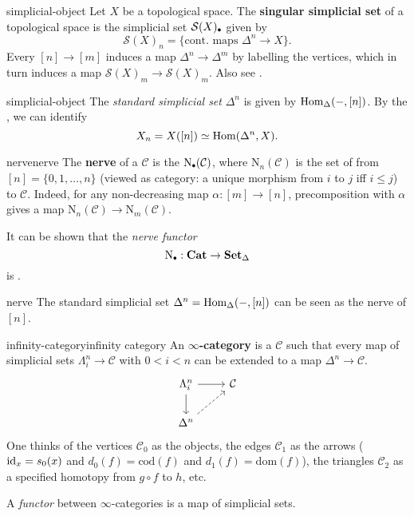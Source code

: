 \begin{example}{simplicial-object}
    Let $X$ be a topological space. The \textbf{singular simplicial set} of a topological space is the simplicial set $\mathcal{S}(X)_\bdot$ given by
    \[ \mathcal{S}(X)_n = \{ \text{cont. maps } \Delta^n \to X \} . \]
    Every $[n] \to [m]$ induces a map $\Delta^n \to \Delta^m$ by labelling the vertices, which in turn induces a map $\mathcal{S}(X)_m \to \mathcal{S}(X)_m$. Also see .
\end{example}

\begin{example}{simplicial-object}
    The \textit{standard simplicial set} $\Delta^n$ is given by $\text{Hom}_\Delta(-, [n])$. By the , we can identify
    \[ X_n = X([n]) \simeq \text{Hom}(\Delta^n, X) . \]
\end{example}

\begin{topic}{nerve}{nerve}
    The \textbf{nerve} of a  $\mathcal{C}$ is the  $\text{N}_\bdot(\mathcal{C})$, where $\text{N}_n(\mathcal{C})$ is the set of  from $[n] = \{ 0, 1, \ldots, n \}$ (viewed as category: a unique morphism from $i$ to $j$ iff $i \le j$) to $\mathcal{C}$.
    Indeed, for any non-decreasing map $\alpha : [m] \to [n]$, precomposition with $\alpha$ gives a map $\text{N}_n(\mathcal{C}) \to \text{N}_m(\mathcal{C})$.
    
    It can be shown that the \textit{nerve functor}
    \[ \text{N}_\bdot : \textbf{Cat} \to \textbf{Set}_\Delta \]
    is  .
\end{topic}

\begin{example}{nerve}
    The standard simplicial set $\Delta^n = \text{Hom}_\Delta(-, [n])$ can be seen as the nerve of $[n]$.
\end{example}

\begin{topic}{infinity-category}{infinity category}
    An \textbf{$\infty$-category} is a  $\mathcal{C}$ such that every map of simplicial sets $\Lambda^n_i \to \mathcal{C}$ with $0 < i < n$ can be extended to a map $\Delta^n \to \mathcal{C}$.
    \[ \begin{tikzcd} \Lambda^n_i \arrow{r} \arrow{d} & \mathcal{C} \\ \Delta^n \arrow[dashed]{ur} & \end{tikzcd} \]
    One thinks of the vertices $\mathcal{C}_0$ as the objects, the edges $\mathcal{C}_1$ as the arrows ($\text{id}_x = s_0(x)$ and $d_0(f) = \text{cod}(f)$ and $d_1(f) = \text{dom}(f)$), the triangles $\mathcal{C}_2$ as a specified homotopy from $g \circ f$ to $h$, etc.
    
    A \textit{functor} between $\infty$-categories is a map of simplicial sets.
\end{topic}


